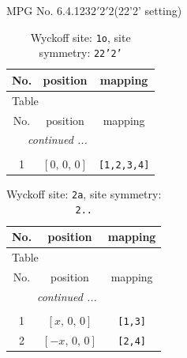 \documentclass[fleqn,8pt]{jsarticle}
\begin{document}
\setcounter{MaxMatrixCols}{32}

\renewcommand{\tablename}{Table~}
\renewcommand{\figurename}{Figure~}
\begin{center}
\LARGE
MPG No. 6.4.123\quad$2'2'2$\quad(22'2' setting)
\end{center}
\renewcommand{\arraystretch}{1.2}
\begin{longtable}{ccc}
\caption{Wyckoff site: {\tt 1o}, site symmetry: {\tt 22'2'}}
 \\
 \hline \hline
No. & position & mapping \\ \hline \endfirsthead

\multicolumn{2}{l}{\tablename\ \thetable{}} \\
 \hline \hline
No. & position & mapping \\ \hline \endhead

 \hline \hline
\multicolumn{2}{r}{\footnotesize\it continued ...} \\ \endfoot

 \hline \hline
\multicolumn{2}{r}{} \\ \endlastfoot

1 & $\left[ 0,\, 0,\, 0 \right]$ & {\tt [1,2,3,4]} \\
\end{longtable}
\renewcommand{\arraystretch}{1.2}
\begin{longtable}{ccc}
\caption{Wyckoff site: {\tt 2a}, site symmetry: {\tt 2..}}
 \\
 \hline \hline
No. & position & mapping \\ \hline \endfirsthead

\multicolumn{2}{l}{\tablename\ \thetable{}} \\
 \hline \hline
No. & position & mapping \\ \hline \endhead

 \hline \hline
\multicolumn{2}{r}{\footnotesize\it continued ...} \\ \endfoot

 \hline \hline
\multicolumn{2}{r}{} \\ \endlastfoot

1 & $\left[ x,\, 0,\, 0 \right]$ & {\tt [1,3]} \\ \hline
2 & $\left[ - x,\, 0,\, 0 \right]$ & {\tt [2,4]} \\
\end{longtable}
\renewcommand{\arraystretch}{1.2}
\end{document}
